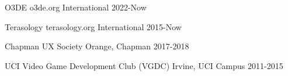 

\begin{cvhonors}

\cvhonor
{O3DE} %
{o3de.org} %
{International} %
{2022-Now } %


\cvhonor
    {Terasology} %
    {terasology.org} %
    {International} %
    {2015-Now } %

\cvhonor
{Chapman UX Society} %
{} %
{Orange, Chapman} %
{2017-2018} %


  \cvhonor
    {UCI Video Game Development Club (VGDC)} %
    {} %
    {Irvine, UCI Campus} %
    {2011-2015} %

\end{cvhonors}